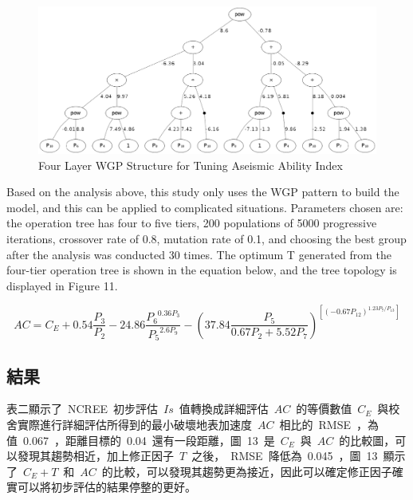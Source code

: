 \begin{figure}[hbtp]
  \begin{center}
    \includegraphics[width=1.0\textwidth]{figures/4-layer-wgp.png}
    \caption{Four Layer WGP Structure for Tuning Aseismic Ability Index} 
    \label{fig:4LWGPTuning}
  \end{center}
\end{figure}

Based on the analysis above, this study only uses the WGP pattern to build the model, and this can be applied to complicated situations. Parameters chosen are: the operation tree has four to five tiers, 200 populations of 5000 progressive iterations, crossover rate of 0.8, mutation rate of 0.1, and choosing the best group after the analysis was conducted 30 times. The optimum T generated from the four-tier operation tree is shown in the equation below, and the tree topology is displayed in Figure 11.

\begin{equation} AC = C_E + 0.54 \dfrac{P_3}{P_2} - 24.86 \dfrac{ {P_6}^{0.36P_3} }{ {P_5}^{2.6P_9} } - ( 37.84 \dfrac{P_5}{0.67P_2 + 5.52P_7} )^{\left[ (-0.67 P_{12})^{1.23P_7/P_{13}} \right]} \label{eq:WGP_AC_IS}\end{equation}


\subsection{結果}

表二顯示了~NCREE~初步評估~$Is$~值轉換成詳細評估~$AC$~的等價數值~$C_E$~與校舍實際進行詳細評估所得到的最小破壞地表加速度~$AC$~相比的~RMSE~，為值~0.067~，距離目標的~0.04~還有一段距離，圖~13~是~$C_E$~與~$AC$~的比較圖，可以發現其趨勢相近，加上修正因子~$T$~之後，~RMSE~降低為~0.045~，圖~13~顯示了~$C_E + T$~和~$AC$~的比較，可以發現其趨勢更為接近，因此可以確定修正因子確實可以將初步評估的結果停整的更好。

